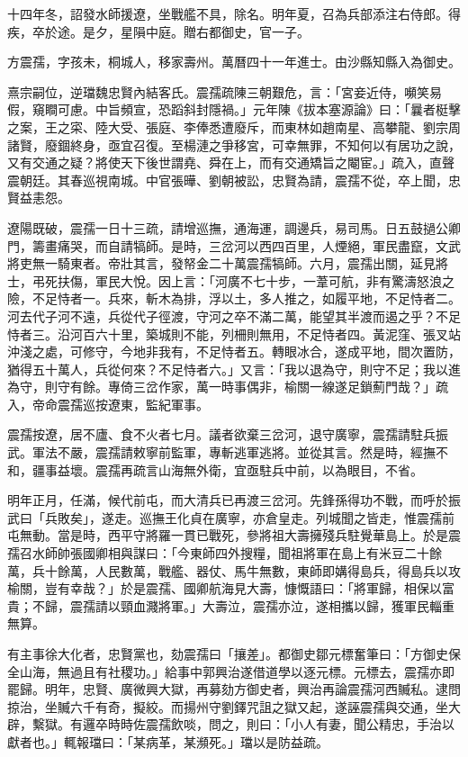 \begin{pinyinscope}
十四年冬，詔發水師援遼，坐戰艦不具，除名。明年夏，召為兵部添注右侍郎。得疾，卒於途。是夕，星隕中庭。贈右都御史，官一子。

方震孺，字孩未，桐城人，移家壽州。萬曆四十一年進士。由沙縣知縣入為御史。

熹宗嗣位，逆璫魏忠賢內結客氏。震孺疏陳三朝艱危，言：「宮妾近侍，嚬笑易假，窺瞷可慮。中旨頻宣，恐蹈斜封隱禍。」元年陳《拔本塞源論》曰：「曩者梃擊之案，王之寀、陸大受、張庭、李俸悉遭廢斥，而東林如趙南星、高攀龍、劉宗周諸賢，廢錮終身，亟宜召復。至楊漣之爭移宮，可幸無罪，不知何以有居功之說，又有交通之疑？將使天下後世謂堯、舜在上，而有交通矯旨之閹宦。」疏入，直聲震朝廷。其春巡視南城。中官張曄、劉朝被訟，忠賢為請，震孺不從，卒上聞，忠賢益恚怨。

遼陽既破，震孺一日十三疏，請增巡撫，通海運，調邊兵，易司馬。日五鼓撾公卿門，籌畫痛哭，而自請犒師。是時，三岔河以西四百里，人煙絕，軍民盡竄，文武將吏無一騎東者。帝壯其言，發帑金二十萬震孺犒師。六月，震孺出關，延見將士，弔死扶傷，軍民大悅。因上言：「河廣不七十步，一葦可航，非有驚濤怒浪之險，不足恃者一。兵來，斬木為排，浮以土，多人推之，如履平地，不足恃者二。河去代子河不遠，兵從代子徑渡，守河之卒不滿二萬，能望其半渡而遏之乎？不足恃者三。沿河百六十里，築城則不能，列柵則無用，不足恃者四。黃泥窪、張叉站沖淺之處，可修守，今地非我有，不足恃者五。轉眼冰合，遂成平地，間次置防，猶得五十萬人，兵從何來？不足恃者六。」又言：「我以退為守，則守不足；我以進為守，則守有餘。專倚三岔作家，萬一時事偶非，榆關一線遂足鎖薊門哉？」疏入，帝命震孺巡按遼東，監紀軍事。

震孺按遼，居不廬、食不火者七月。議者欲棄三岔河，退守廣寧，震孺請駐兵振武。軍法不嚴，震孺請敕寧前監軍，專斬逃軍逃將。並從其言。然是時，經撫不和，疆事益壞。震孺再疏言山海無外衛，宜亟駐兵中前，以為眼目，不省。

明年正月，任滿，候代前屯，而大清兵已再渡三岔河。先鋒孫得功不戰，而呼於振武曰「兵敗矣」，遂走。巡撫王化貞在廣寧，亦倉皇走。列城聞之皆走，惟震孺前屯無動。當是時，西平守將羅一貫已戰死，參將祖大壽擁殘兵駐覺華島上。於是震孺召水師帥張國卿相與謀曰：「今東師四外搜糧，聞祖將軍在島上有米豆二十餘萬，兵十餘萬，人民數萬，戰艦、器仗、馬牛無數，東師即媾得島兵，得島兵以攻榆關，豈有幸哉？」於是震孺、國卿航海見大壽，慷慨語曰：「將軍歸，相保以富貴；不歸，震孺請以頸血濺將軍。」大壽泣，震孺亦泣，遂相攜以歸，獲軍民輜重無算。

有主事徐大化者，忠賢黨也，劾震孺曰「攘差」。都御史鄒元標奮筆曰：「方御史保全山海，無過且有社稷功。」給事中郭興治遂借道學以逐元標。元標去，震孺亦即罷歸。明年，忠賢、廣微興大獄，再募劾方御史者，興治再論震孺河西贓私。逮問掠治，坐贓六千有奇，擬絞。而揚州守劉鐸咒詛之獄又起，遂誣震孺與交通，坐大辟，繫獄。有邏卒時時佐震孺飲啖，問之，則曰：「小人有妻，聞公精忠，手治以獻者也。」輒報璫曰：「某病革，某瀕死。」璫以是防益疏。


\end{pinyinscope}
